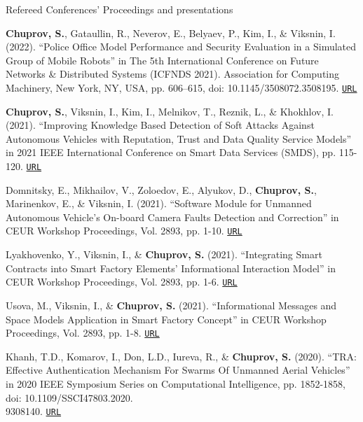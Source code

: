 \begin{rSection}{Refereed Conferences' Proceedings and presentations}
\begin{enumerate}[label=[C{{\arabic*}]}]
\item \textbf{Chuprov, S.}, Gataullin, R., Neverov, E., Belyaev, P., Kim, I., \& Viksnin, I. (2022). ``Police Office Model Performance and Security Evaluation in a Simulated Group of Mobile Robots'' in The 5th International Conference on Future Networks \& Distributed Systems (ICFNDS 2021). Association for Computing Machinery, New York, NY, USA, pp. 606–615, doi: 10.1145/3508072.3508195. \href{https://dl.acm.org/doi/abs/10.1145/3508072.3508195?casa_token=emU3vhg0J98AAAAA:DwcQ-b1JVuMRRTeGcLDn6ZFtiSzuP4CL88yTMTYZIYGehMFD-kwUEAlGoYH-j-yRxkK1xONmBQo}{\nolinkurl{URL}}

\item \textbf{Chuprov, S.}, Viksnin, I., Kim, I., Melnikov, T., Reznik, L., \& Khokhlov, I. (2021). ``Improving Knowledge Based Detection of Soft Attacks Against Autonomous Vehicles with Reputation, Trust and Data Quality Service Models'' in 2021 IEEE International Conference on Smart Data Services (SMDS), pp. 115-120. \href{https://ieeexplore.ieee.org/document/9592379}{\nolinkurl{URL}}

\item Domnitsky, E., Mikhailov, V., Zoloedov, E., Alyukov, D., \textbf{Chuprov, S.}, Marinenkov, E., \& Viksnin, I. (2021). ``Software Module for Unmanned Autonomous Vehicle’s On-board Camera Faults Detection and Correction'' in CEUR Workshop Proceedings, Vol. 2893, pp. 1-10. \href{http://ceur-ws.org/Vol-2893/paper_18.pdf}{\nolinkurl{URL}}

\item Lyakhovenko, Y., Viksnin, I., \& \textbf{Chuprov, S.} (2021). ``Integrating Smart Contracts into Smart Factory Elements’ Informational Interaction Model'' in CEUR Workshop Proceedings, Vol. 2893, pp. 1-6. \href{http://ceur-ws.org/Vol-2893/short_4.pdf}{\nolinkurl{URL}}

\item Usova, M., Viksnin, I., \& \textbf{Chuprov, S.} (2021). ``Informational Messages and Space Models Application in Smart Factory Concept'' in CEUR Workshop Proceedings, Vol. 2893, pp. 1-8. \href{http://ceur-ws.org/Vol-2893/short_3.pdf}{\nolinkurl{URL}}

\item Khanh, T.D., Komarov, I., Don, L.D., Iureva, R., \& \textbf{Chuprov, S.} (2020). ``TRA: Effective Authentication Mechanism For Swarms Of Unmanned Aerial Vehicles'' in 2020 IEEE Symposium Series on Computational Intelligence, pp. 1852-1858, doi: 10.1109/SSCI47803.2020.\\
9308140. \href{https://ieeexplore.ieee.org/document/9308140}{\nolinkurl{URL}}


\end{enumerate}
\end{rSection}
